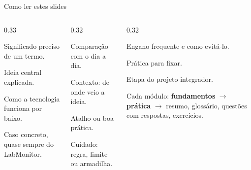 \documentclass[aspectratio=169,10pt]{beamer}
\begin{document}
\begin{frame}{Como ler estes slides}
  \begin{columns}[T]
    \begin{column}{0.33\textwidth}
      \begin{definicao}
        Significado preciso de um termo.
      \end{definicao}
      \begin{conceito}
        Ideia central explicada.
      \end{conceito}
      \begin{pordentro}
        Como a tecnologia funciona por baixo.
      \end{pordentro}
      \begin{exemplo}
        Caso concreto, quase sempre do LabMonitor.
      \end{exemplo}
    \end{column}
    \begin{column}{0.32\textwidth}
      \begin{analogia}
        Comparação com o dia a dia.
      \end{analogia}
      \begin{historia}
        Contexto: de onde veio a ideia.
      \end{historia}
      \begin{dica}
        Atalho ou boa prática.
      \end{dica}
      \begin{atencao}
        Cuidado: regra, limite ou armadilha.
      \end{atencao}
    \end{column}
    \begin{column}{0.32\textwidth}
      \begin{erro}
        Engano frequente e como evitá-lo.
      \end{erro}
      \begin{exercicio}
        Prática para fixar.
      \end{exercicio}
      \begin{projeto}
        Etapa do projeto integrador.
      \end{projeto}
      \begin{caixadestaque}
        \scriptsize Cada módulo: \textbf{fundamentos} $\rightarrow$ \textbf{prática} $\rightarrow$ resumo, glossário, questões com respostas, exercícios.
      \end{caixadestaque}
    \end{column}
  \end{columns}
\end{frame}
\end{document}
